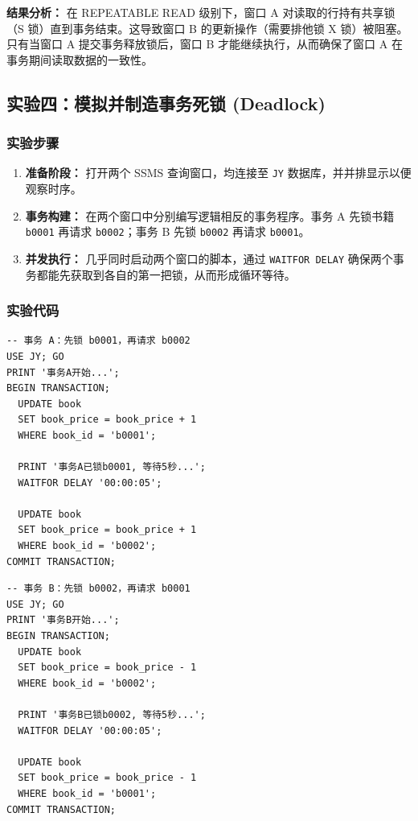 \documentclass[a4paper]{article}
\begin{document}
\textbf{结果分析：} 在 REPEATABLE READ 级别下，窗口 A 对读取的行持有共享锁（S 锁）直到事务结束。这导致窗口 B 的更新操作（需要排他锁 X 锁）被阻塞。只有当窗口 A 提交事务释放锁后，窗口 B 才能继续执行，从而确保了窗口 A 在事务期间读取数据的一致性。

\subsection{实验四：模拟并制造事务死锁 (Deadlock)}
\subsubsection{实验步骤}
\begin{enumerate}
    \item \textbf{准备阶段：} 打开两个 SSMS 查询窗口，均连接至 \texttt{JY} 数据库，并并排显示以便观察时序。
    \item \textbf{事务构建：} 在两个窗口中分别编写逻辑相反的事务程序。事务 A 先锁书籍 \texttt{b0001} 再请求 \texttt{b0002}；事务 B 先锁 \texttt{b0002} 再请求 \texttt{b0001}。
    \item \textbf{并发执行：} 几乎同时启动两个窗口的脚本，通过 \texttt{WAITFOR DELAY} 确保两个事务都能先获取到各自的第一把锁，从而形成循环等待。
\end{enumerate}

\subsubsection{实验代码}
\begin{minipage}[t]{0.45\textwidth}
\begin{lstlisting}[caption={窗口 1：事务 A}]
-- 事务 A：先锁 b0001，再请求 b0002
USE JY; GO
PRINT '事务A开始...';
BEGIN TRANSACTION;
  UPDATE book 
  SET book_price = book_price + 1 
  WHERE book_id = 'b0001';
  
  PRINT '事务A已锁b0001, 等待5秒...';
  WAITFOR DELAY '00:00:05';
  
  UPDATE book 
  SET book_price = book_price + 1 
  WHERE book_id = 'b0002';
COMMIT TRANSACTION;
\end{lstlisting}
\end{minipage}
\hfill
\begin{minipage}[t]{0.45\textwidth}
\begin{lstlisting}[caption={窗口 2：事务 B}]
-- 事务 B：先锁 b0002，再请求 b0001
USE JY; GO
PRINT '事务B开始...';
BEGIN TRANSACTION;
  UPDATE book 
  SET book_price = book_price - 1 
  WHERE book_id = 'b0002';
  
  PRINT '事务B已锁b0002, 等待5秒...';
  WAITFOR DELAY '00:00:05';
  
  UPDATE book 
  SET book_price = book_price - 1 
  WHERE book_id = 'b0001';
COMMIT TRANSACTION;
\end{lstlisting}
\end{minipage}
\end{document}

